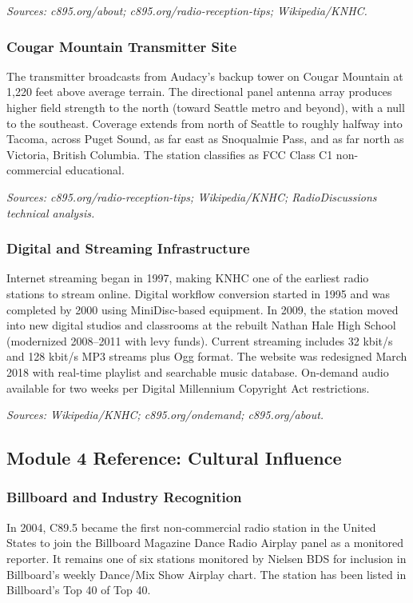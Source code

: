 \documentclass[11pt,letterpaper]{article}
\begin{document}
\textit{Sources: c895.org/about; c895.org/radio-reception-tips; Wikipedia/KNHC.}

\subsubsection{Cougar Mountain Transmitter Site}

The transmitter broadcasts from Audacy's backup tower on Cougar Mountain at 1,220 feet above average terrain. The directional panel antenna array produces higher field strength to the north (toward Seattle metro and beyond), with a null to the southeast. Coverage extends from north of Seattle to roughly halfway into Tacoma, across Puget Sound, as far east as Snoqualmie Pass, and as far north as Victoria, British Columbia. The station classifies as FCC Class C1 non-commercial educational.

\textit{Sources: c895.org/radio-reception-tips; Wikipedia/KNHC; RadioDiscussions technical analysis.}

\subsubsection{Digital and Streaming Infrastructure}

Internet streaming began in 1997, making KNHC one of the earliest radio stations to stream online. Digital workflow conversion started in 1995 and was completed by 2000 using MiniDisc-based equipment. In 2009, the station moved into new digital studios and classrooms at the rebuilt Nathan Hale High School (modernized 2008--2011 with levy funds). Current streaming includes 32 kbit/s and 128 kbit/s MP3 streams plus Ogg format. The website was redesigned March 2018 with real-time playlist and searchable music database. On-demand audio available for two weeks per Digital Millennium Copyright Act restrictions.

\textit{Sources: Wikipedia/KNHC; c895.org/ondemand; c895.org/about.}

\subsection{Module 4 Reference: Cultural Influence}

\subsubsection{Billboard and Industry Recognition}

In 2004, C89.5 became the first non-commercial radio station in the United States to join the Billboard Magazine Dance Radio Airplay panel as a monitored reporter. It remains one of six stations monitored by Nielsen BDS for inclusion in Billboard's weekly Dance/Mix Show Airplay chart. The station has been listed in Billboard's Top 40 of Top 40.
\end{document}
